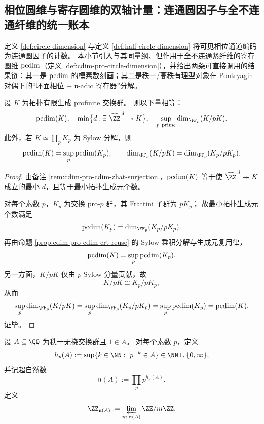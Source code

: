 \subsection{相位圆维与寄存圆维的双轴计量：连通圆因子与全不连通纤维的统一账本}\label{subsec:cdim-phase-register-biaxial-ledger}
定义 \ref{def:circle-dimension} 与定义 \ref{def:half-circle-dimension} 将可见相位通道编码为连通圆因子的计数。
本小节引入与其同量纲、但作用于全不连通紧纤维的寄存圆维 \(\operatorname{pcdim}\)（定义 \ref{def:cdim-pro-circle-dimension}），并给出两条可直接调用的结果链：其一是 \(\operatorname{pcdim}\) 的模素数刻画；其二是秩一/高秩有理型对象在 Pontryagin 对偶下的“环面相位 + \(\mathfrak n\)-adic 寄存器”分解。

\begin{theorem}[寄存圆维的等价刻画与模素数公式]\label{thm:cdim-register-circle-modp-formula}
设 \(K\) 为拓扑有限生成 profinite 交换群。
则以下量相等：
\[
\pcdim(K),
\quad
\min\bigl\{d:\exists\ \widehat{\ZZ}^{\,d}\twoheadrightarrow K\bigr\},
\quad
\sup_{p\ \mathrm{prime}}\dim_{\FF_p}(K/pK).
\]
此外，若 \(K\simeq\prod_p K_p\) 为 Sylow 分解，则
\[
\pcdim(K)=\sup_p \pcdim(K_p),
\qquad
\dim_{\FF_p}(K/pK)=\dim_{\FF_p}(K_p/pK_p).
\]
\end{theorem}
\begin{proof}
由备注 \ref{rem:cdim-pro-cdim-zhat-surjection}，\(\operatorname{pcdim}(K)\) 等于使 \(\widehat{\ZZ}^{\,d}\twoheadrightarrow K\) 成立的最小 \(d\)，且等于最小拓扑生成元个数。

对每个素数 \(p\)，\(K_p\) 为交换 pro-\(p\) 群，其 Frattini 子群为 \(pK_p\)；
故最小拓扑生成元个数满足
\[
\pcdim(K_p)=\dim_{\FF_p}(K_p/pK_p).
\]
再由命题 \ref{prop:cdim-pro-cdim-crt-reuse} 的 Sylow 乘积分解与生成元复用律，
\[
\operatorname{pcdim}(K)=\sup_p \operatorname{pcdim}(K_p).
\]
另一方面，\(K/pK\) 仅由 \(p\)-Sylow 分量贡献，故
\[
K/pK\cong K_p/pK_p,
\]
从而
\[
\sup_p\dim_{\FF_p}(K/pK)
=\sup_p\dim_{\FF_p}(K_p/pK_p)
=\sup_p\pcdim(K_p)
=\pcdim(K).
\]
证毕。
\end{proof}

\begin{definition}[秩一分母高度与超自然谱]\label{def:cdim-rankone-height-supernatural}
设 \(A\subseteq \QQ\) 为秩一无挠交换群且 \(1\in A\)。
对每个素数 \(p\)，定义
\[
h_p(A):=\sup\{k\in\NN:\ p^{-k}\in A\}\in\NN\cup\{0,\infty\},
\]
并记超自然数
\[
\mathfrak n(A):=\prod_p p^{h_p(A)}.
\]
定义
\[
\ZZ_{\mathfrak n(A)}:=\varprojlim_{m\mid\mathfrak n(A)}\ZZ/m\ZZ.
\]
\end{definition}

